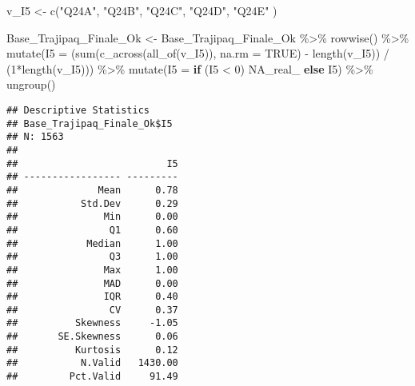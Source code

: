 \documentclass[
]{article}
\newenvironment{Shaded}{\begin{snugshade}}{\end{snugshade}}
\newcommand{\AttributeTok}[1]{\textcolor[rgb]{0.77,0.63,0.00}{#1}}
\newcommand{\ConstantTok}[1]{\textcolor[rgb]{0.00,0.00,0.00}{#1}}
\newcommand{\ControlFlowTok}[1]{\textcolor[rgb]{0.13,0.29,0.53}{\textbf{#1}}}
\newcommand{\DecValTok}[1]{\textcolor[rgb]{0.00,0.00,0.81}{#1}}
\newcommand{\FunctionTok}[1]{\textcolor[rgb]{0.00,0.00,0.00}{#1}}
\newcommand{\NormalTok}[1]{#1}
\newcommand{\OtherTok}[1]{\textcolor[rgb]{0.56,0.35,0.01}{#1}}
\newcommand{\SpecialCharTok}[1]{\textcolor[rgb]{0.00,0.00,0.00}{#1}}
\newcommand{\StringTok}[1]{\textcolor[rgb]{0.31,0.60,0.02}{#1}}
\begin{document}
\begin{Shaded}
\begin{Highlighting}[]
\NormalTok{v\_I5 }\OtherTok{\textless{}{-}} \FunctionTok{c}\NormalTok{(}\StringTok{"Q24A"}\NormalTok{,}
          \StringTok{"Q24B"}\NormalTok{,}
          \StringTok{"Q24C"}\NormalTok{,}
          \StringTok{"Q24D"}\NormalTok{,}
          \StringTok{"Q24E"}
\NormalTok{          )}

\NormalTok{Base\_Trajipaq\_Finale\_Ok }\OtherTok{\textless{}{-}}
\NormalTok{  Base\_Trajipaq\_Finale\_Ok }\SpecialCharTok{\%\textgreater{}\%}
  \FunctionTok{rowwise}\NormalTok{() }\SpecialCharTok{\%\textgreater{}\%}
  \FunctionTok{mutate}\NormalTok{(}\AttributeTok{I5 =}\NormalTok{ (}\FunctionTok{sum}\NormalTok{(}\FunctionTok{c\_across}\NormalTok{(}\FunctionTok{all\_of}\NormalTok{(v\_I5)), }\AttributeTok{na.rm =} \ConstantTok{TRUE}\NormalTok{) }\SpecialCharTok{{-}} \FunctionTok{length}\NormalTok{(v\_I5)) }\SpecialCharTok{/}\NormalTok{ (}\DecValTok{1}\SpecialCharTok{*}\FunctionTok{length}\NormalTok{(v\_I5))) }\SpecialCharTok{\%\textgreater{}\%}
  \FunctionTok{mutate}\NormalTok{(}\AttributeTok{I5 =} \ControlFlowTok{if}\NormalTok{ (I5 }\SpecialCharTok{\textless{}} \DecValTok{0}\NormalTok{) }\ConstantTok{NA\_real\_} \ControlFlowTok{else}\NormalTok{ I5) }\SpecialCharTok{\%\textgreater{}\%}
  \FunctionTok{ungroup}\NormalTok{()}
\end{Highlighting}
\end{Shaded}

\begin{Shaded}
\end{Shaded}

\begin{verbatim}
## Descriptive Statistics  
## Base_Trajipaq_Finale_Ok$I5  
## N: 1563  
## 
##                          I5
## ----------------- ---------
##              Mean      0.78
##           Std.Dev      0.29
##               Min      0.00
##                Q1      0.60
##            Median      1.00
##                Q3      1.00
##               Max      1.00
##               MAD      0.00
##               IQR      0.40
##                CV      0.37
##          Skewness     -1.05
##       SE.Skewness      0.06
##          Kurtosis      0.12
##           N.Valid   1430.00
##         Pct.Valid     91.49
\end{verbatim}
\end{document}
